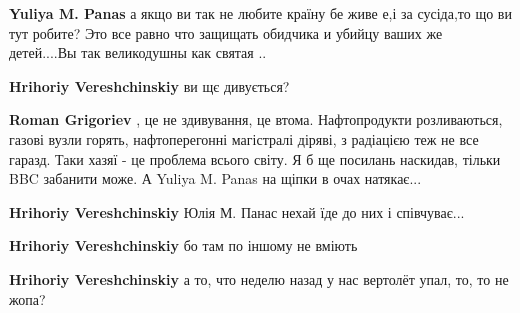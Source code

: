 \begin{itemize}
\begin{itemize}
\begin{itemize}
\textbf{Yuliya M. Panas} а якщо ви так не любите країну бе живе е,і за сусіда,то що ви тут робите?
Это все равно что защищать обидчика и убийцу ваших же детей....Вы так великодушны как святая ..
\end{itemize}

 
\textbf{Hrihoriy Vereshchinskiy} ви щє дивується?

\begin{itemize}
 
\textbf{Roman Grigoriev} , це не здивування, це втома. Нафтопродукти розливаються, газові вузли горять, нафтоперегонні магістралі діряві, з радіацією теж не все гаразд. Таки хазяї - це проблема всього світу. Я б ще посилань наскидав, тільки BBC забанити може. А Yuliya M. Panas на щіпки в очах натякає...

 
\textbf{Hrihoriy Vereshchinskiy} Юлія М. Панас нехай їде до них і співчуває...
\end{itemize}

 
\textbf{Hrihoriy Vereshchinskiy} бо там по іншому не вміють

 
\textbf{Hrihoriy Vereshchinskiy} а то, что неделю назад у нас вертолёт упал, то, то не жопа?


\end{itemize}
\end{itemize}
